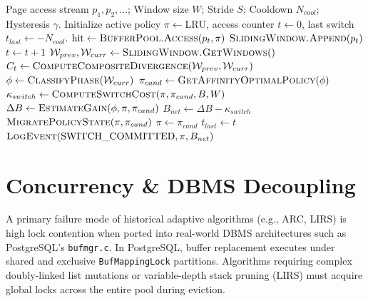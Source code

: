\documentclass[conference]{IEEEtran}
\begin{document}
\begin{algorithm}[t]
\caption{MEMORA Closed-Loop Buffer Management}
\label{alg:memora}
\begin{algorithmic}[1]
\Require Page access stream $p_1, p_2, \dots$; Window size $W$; Stride $S$; Cooldown $N_{cool}$; Hysteresis $\gamma$.
\State Initialize active policy $\pi \gets \text{LRU}$, access counter $t \gets 0$, last switch $t_{last} \gets -N_{cool}$.
    \State $\text{hit} \gets \Call{BufferPool.Access}{p_t, \pi}$
    \State $\Call{SlidingWindow.Append}{p_t}$
    \State $t \gets t + 1$
        \State $\mathcal{W}_{prev}, \mathcal{W}_{curr} \gets \Call{SlidingWindow.GetWindows}{ }$
        \State $C_t \gets \Call{ComputeCompositeDivergence}{\mathcal{W}_{prev}, \mathcal{W}_{curr}}$
            \State $\phi \gets \Call{ClassifyPhase}{\mathcal{W}_{curr}}$
            \State $\pi_{cand} \gets \Call{GetAffinityOptimalPolicy}{\phi}$
                \State $\kappa_{switch} \gets \Call{ComputeSwitchCost}{\pi, \pi_{cand}, B, W}$
                \State $\Delta B \gets \Call{EstimateGain}{\phi, \pi, \pi_{cand}}$
                \State $B_{net} \gets \Delta B - \kappa_{switch}$
                    \State $\Call{MigratePolicyState}{\pi, \pi_{cand}}$
                    \State $\pi \gets \pi_{cand}$
                    \State $t_{last} \gets t$
                    \State $\Call{LogEvent}{\text{SWITCH\_COMMITTED}, \pi, B_{net}}$
                \EndIf
            \EndIf
        \EndIf
    \EndIf
\EndFor
\end{algorithmic}
\end{algorithm}

\section{Concurrency \& DBMS Decoupling}
A primary failure mode of historical adaptive algorithms (e.g., ARC, LIRS) is high lock contention when ported into real-world DBMS architectures such as PostgreSQL's \texttt{bufmgr.c}. In PostgreSQL, buffer replacement executes under shared and exclusive \texttt{BufMappingLock} partitions. Algorithms requiring complex doubly-linked list mutations or variable-depth stack pruning (LIRS) must acquire global locks across the entire pool during eviction.
\end{document}
